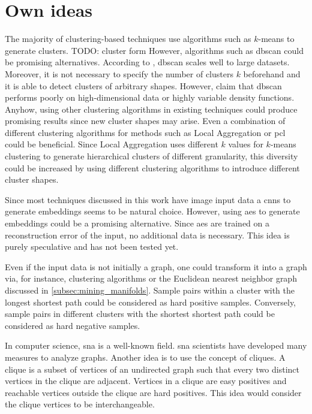 \section{Own ideas}\label{sec:own_ideas}

The majority of clustering-based techniques use algorithms such as $k$-means to generate clusters.
TODO: cluster form
However, algorithms such as \ac{dbscan} could be promising alternatives.
According to \citet{local_aggr_2019}, \ac{dbscan} scales well to large datasets.
Moreover, it is not necessary to specify the number of clusters $k$ beforehand and 
it is able to detect clusters of arbitrary shapes.
However, \citeauthor{local_aggr_2019} claim that \ac{dbscan} performs poorly on 
high-dimensional data or highly variable density functions.
Anyhow, using other clustering algorithms in existing techniques 
could produce promising results since new cluster shapes may arise.
Even a combination of different clustering algorithms for methods such as 
Local Aggregation \citet{local_aggr_2019} or \ac{pcl} \citet{PCL_2021} could be beneficial.
Since Local Aggregation uses different $k$ values for $k$-means clustering to generate hierarchical clusters of different granularity, 
this diversity could be increased by using different clustering algorithms to introduce different cluster shapes.

Since most techniques discussed in this work have image input data a \acp{cnn} to generate embeddings seems to be natural choice.
However, using \acp{ae} to generate embeddings could be a promising alternative.
Since \acp{ae} are trained on a reconstruction error of the input, no additional data is necessary.
This idea is purely speculative and has not been tested yet.

Even if the input data is not initially a graph, one could transform it into a graph via, for instance, 
clustering algorithms or the Euclidean nearest neighbor graph discussed in \autoref{subsec:mining_manifolds}.
Sample pairs within a cluster with the longest shortest path could be considered as hard positive samples.
Conversely, sample pairs in different clusters with the shortest shortest path could be considered as hard negative samples.

In computer science, \ac{sna} is a well-known field.
\ac{sna} scientists have developed many measures to analyze graphs.
Another idea is to use the concept of cliques.
A clique is a subset of vertices of an undirected graph such that every two distinct vertices in the clique are adjacent.
Vertices in a clique are easy positives and reachable vertices outside the clique are hard positives.
This idea would consider the clique vertices to be interchangeable.

